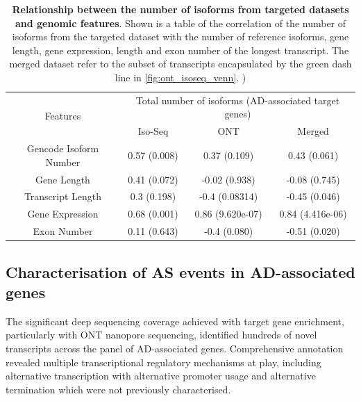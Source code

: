 \begin{table}[!hp]
	\centering
	\captionsetup{width=0.95\textwidth}
	\caption[Relationship between the number of isoforms from targeted datasets and genomic features]%
	{\textbf{Relationship between the number of isoforms from targeted datasets and genomic features}. Shown is a table of the correlation of the number of isoforms from the targeted dataset with the number of reference isoforms, gene length, gene expression, length and exon number of the longest transcript. The merged dataset refer to the subset of transcripts encapsulated by the green dash line in \cref{fig:ont_isoseq_venn}. )}
	\label{tab:isoformnum_corr}	
	\begin{tabular}{cccc}
		\hline
		\multirow{2}{*}{Features} & \multicolumn{3}{c}{Total number of isoforms (AD-associated target genes)} \\ \cline{2-4} 
		& Iso-Seq & ONT & Merged \\ \cline{1-4} 
		Gencode Isoform Number & 0.57 (0.008) & 0.37 (0.109)     & 0.43 (0.061)     \\
		Gene Length            & 0.41 (0.072) & -0.02 (0.938)    & -0.08 (0.745)    \\
		Transcript Length      & 0.3 (0.198)  & -0.4 (0.08314)   & -0.45 (0.046)    \\
		Gene Expression        & 0.68 (0.001) & 0.86 (9.620e-07) & 0.84 (4.416e-06) \\
		Exon Number            & 0.11 (0.643) & -0.4 (0.080)     & -0.51 (0.020)    \\ \hline
	\end{tabular}
\end{table}

\clearpage

\subsection{Characterisation of AS events in AD-associated genes}
The significant deep sequencing coverage achieved with target gene enrichment, particularly with ONT nanopore sequencing, identified hundreds of novel transcripts across the panel of AD-associated genes. Comprehensive annotation revealed multiple transcriptional regulatory mechanisms at play, including alternative transcription with alternative promoter usage and alternative termination which were not previously characterised. 

